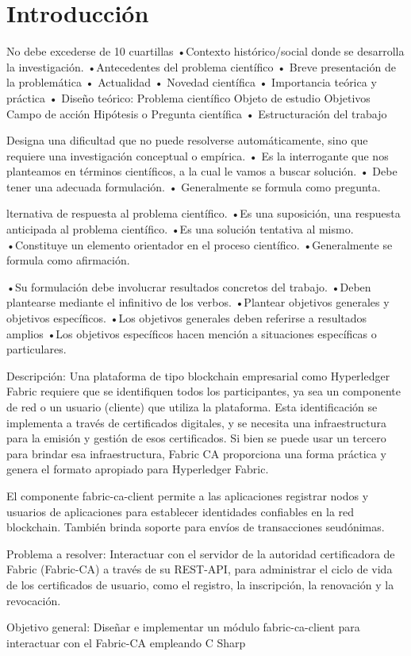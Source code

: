 \chapter*{Introducción}\label{chapter:introduction}
No debe excederse de 10 cuartillas
•Contexto histórico/social donde se desarrolla la 
investigación.
•Antecedentes del problema científico
• Breve presentación de la problemática
• Actualidad
• Novedad científica 
• Importancia teórica y práctica 
• Diseño teórico: 
Problema científico
Objeto de estudio 
Objetivos 
Campo de acción
Hipótesis o Pregunta científica
• Estructuración del trabajo

 Designa una dificultad que no puede resolverse
 automáticamente, sino que requiere una
 investigación conceptual o empírica.
 • Es la interrogante que nos planteamos en
 términos científicos, a la cual le vamos a buscar
 solución.
 • Debe tener una adecuada formulación.
 • Generalmente se formula como pregunta.
 
 lternativa de respuesta al problema
 científico.
 •Es una suposición, una respuesta anticipada al
 problema científico.
 •Es una solución tentativa al mismo.
 •Constituye un elemento orientador en el
 proceso científico.
 •Generalmente se formula como afirmación.
 
 •Su formulación debe involucrar resultados
 concretos del trabajo.
 •Deben plantearse mediante el infinitivo de los
 verbos.
 •Plantear objetivos generales y objetivos específicos.
 •Los objetivos generales deben referirse a resultados
 amplios
 •Los objetivos específicos hacen mención a
 situaciones específicas o particulares.
 
Descripción: Una plataforma de tipo blockchain empresarial como Hyperledger Fabric requiere que se identifiquen todos los participantes, ya sea un componente de red o un usuario (cliente) que utiliza la plataforma. Esta identificación se implementa a través de certificados digitales, y se necesita una infraestructura para la emisión y gestión de esos certificados.
Si bien se puede usar un tercero para brindar esa infraestructura, Fabric CA proporciona una forma práctica y genera el formato apropiado para Hyperledger Fabric.

El componente fabric-ca-client permite a las aplicaciones registrar nodos y usuarios de aplicaciones para establecer identidades confiables en la red blockchain. También brinda soporte para envíos de transacciones seudónimas.

Problema a resolver: Interactuar con el servidor de la autoridad certificadora de Fabric (Fabric-CA) a través de su REST-API, para administrar el ciclo de vida de los certificados de usuario, como el registro, la inscripción, la renovación y la revocación.

Objetivo general: Dise\~nar e implementar un módulo fabric-ca-client para interactuar con el Fabric-CA empleando C Sharp


